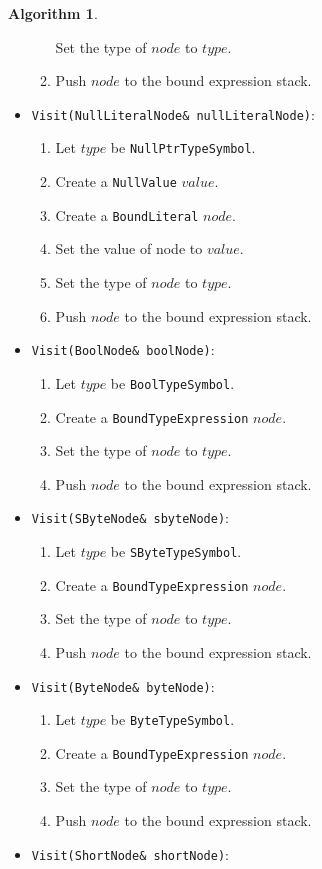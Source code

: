 \documentclass[a4paper,oneside,11pt]{book}
\theoremstyle{definition}
\newtheorem{algo}{Algorithm}[section]
\begin{document}
\begin{algo}
\begin{itemize}
\begin{enumerate}
Set the type of $node$ to $type$.
\item
Push $node$ to the bound expression stack.
\end{enumerate}
\item
\verb|Visit(NullLiteralNode& nullLiteralNode)|:
\begin{enumerate}
\item
Let $type$ be \verb|NullPtrTypeSymbol|.
\item
Create a \verb|NullValue| $value$.
\item
Create a \verb|BoundLiteral| $node$.
\item
Set the value of node to $value$.
\item
Set the type of $node$ to $type$.
\item
Push $node$ to the bound expression stack.
\end{enumerate}
\item
\verb|Visit(BoolNode& boolNode)|:
\begin{enumerate}
\item
Let $type$ be \verb|BoolTypeSymbol|.
\item
Create a \verb|BoundTypeExpression| $node$.
\item
Set the type of $node$ to $type$.
\item
Push $node$ to the bound expression stack.
\end{enumerate}
\item
\verb|Visit(SByteNode& sbyteNode)|:
\begin{enumerate}
\item
Let $type$ be \verb|SByteTypeSymbol|.
\item
Create a \verb|BoundTypeExpression| $node$.
\item
Set the type of $node$ to $type$.
\item
Push $node$ to the bound expression stack.
\end{enumerate}
\item
\verb|Visit(ByteNode& byteNode)|:
\begin{enumerate}
\item
Let $type$ be \verb|ByteTypeSymbol|.
\item
Create a \verb|BoundTypeExpression| $node$.
\item
Set the type of $node$ to $type$.
\item
Push $node$ to the bound expression stack.
\end{enumerate}
\item
\verb|Visit(ShortNode& shortNode)|:
\begin{enumerate}

\end{enumerate}
\end{itemize}
\end{algo}
\end{document}
